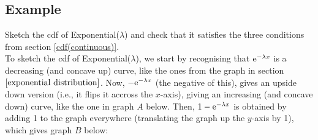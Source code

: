 \subsection{Example}
Sketch the cdf of Exponential($\lambda$) and check that it satisfies the three conditions from section \ref{cdf(continuous)}. \\

\solution
\noindent To sketch the cdf of Exponential($\lambda$), we start by recognising that $\mathrm{e}^{-\lambda x}$ is a decreasing (and concave up) curve, like the ones from the graph in section $\ref{exponential distribution}$. Now, $-\mathrm{e}^{-\lambda x}$ (the negative of this), gives an upside down version (i.e., it flips it accross the $x$-axis), giving an increasing (and concave down) curve, like the one in graph $A$ below. Then, $1-\mathrm{e}^{-\lambda x}$ is obtained by adding 1 to the graph everywhere (translating the graph up the $y$-axis by 1), which gives graph $B$ below:  
\begin{center}
\begin{minipage}{0.4\textwidth}
	\begin{center}
	\end{center}
\end{minipage}
\begin{minipage}{0.1\textwidth}
\begin{center}
\end{center}
\end{minipage}
\begin{minipage}{0.4\textwidth}
	\begin{center}
	\end{center}
\end{minipage}
\end{center}

